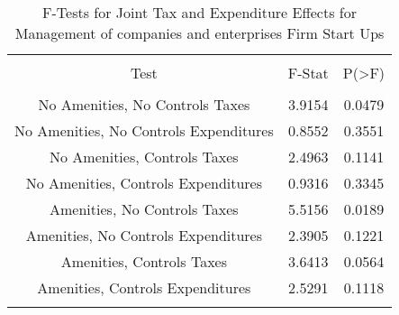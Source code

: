 
\begin{table}[!htbp] \centering 
  \caption{F-Tests for Joint Tax and Expenditure Effects for Management of companies and enterprises Firm Start Ups} 
  \label{55Ftests} 
\begin{tabular}{@{\extracolsep{5pt}} ccc} 
\\[-1.8ex]\hline 
\hline \\[-1.8ex] 
Test & F-Stat & P(\textgreater F) \\ 
\hline \\[-1.8ex] 
No Amenities, No Controls Taxes & 3.9154 & 0.0479 \\ 
No Amenities, No Controls Expenditures & 0.8552 & 0.3551 \\ 
No Amenities, Controls Taxes & 2.4963 & 0.1141 \\ 
No Amenities, Controls Expenditures & 0.9316 & 0.3345 \\ 
Amenities, No Controls Taxes & 5.5156 & 0.0189 \\ 
Amenities, No Controls Expenditures & 2.3905 & 0.1221 \\ 
Amenities, Controls Taxes & 3.6413 & 0.0564 \\ 
Amenities, Controls Expenditures & 2.5291 & 0.1118 \\ 
\hline \\[-1.8ex] 
\end{tabular} 
\end{table} 
